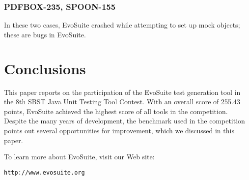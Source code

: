 \documentclass[sigconf]{acmart}
\newcommand{\EVOSUITE}{{\sc EvoSuite}\xspace}
\newcommand{\TOTALPOINTS}{{255.43}\xspace}
\begin{document}

\subsubsection*{PDFBOX-235, SPOON-155} In these two cases, \EVOSUITE crashed while attempting to set up mock objects; these are bugs in \EVOSUITE.


\section{Conclusions}

This paper reports on the participation of the \EVOSUITE test
generation tool in the 8th SBST Java Unit Testing Tool Contest. With
an overall score of \TOTALPOINTS points, \EVOSUITE achieved the
highest score of all tools in the competition. Despite the many years of development, the benchmark used in the competition points out several opportunities for improvement, which we discussed in this paper.

To learn more about \EVOSUITE, visit our Web site:
\begin{center}
\texttt{http://www.evosuite.org}
\end{center}


\balance


\end{document}
